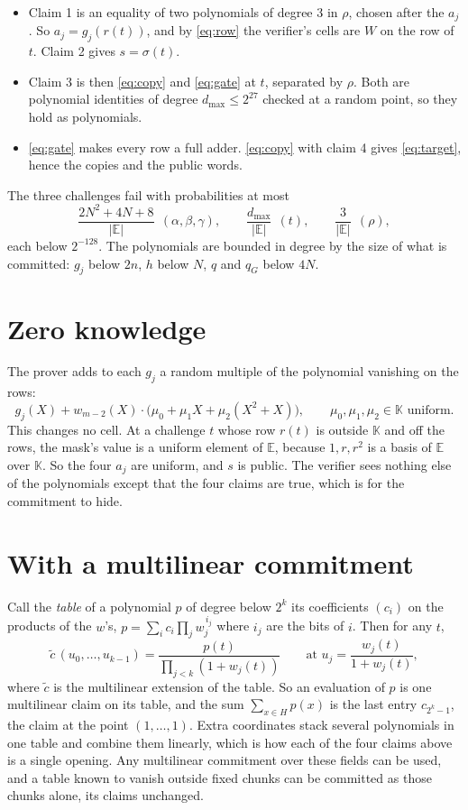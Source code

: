 \documentclass[11pt]{article}
\newcommand{\K}{\mathbb{K}}
\newcommand{\E}{\mathbb{E}}
\begin{document}
\begin{itemize}
  \item Claim 1 is an equality of two polynomials of degree 3 in $\rho$, chosen after the $a_j$. So $a_j = g_j(r(t))$, and by \eqref{eq:row} the verifier's cells are $W$ on the row of $t$. Claim 2 gives $s = \sigma(t)$.
  \item Claim 3 is then \eqref{eq:copy} and \eqref{eq:gate} at $t$, separated by $\rho$. Both are polynomial identities of degree $d_{\max} \le 2^{27}$ checked at a random point, so they hold as polynomials.
  \item \eqref{eq:gate} makes every row a full adder. \eqref{eq:copy} with claim 4 gives \eqref{eq:target}, hence the copies and the public words.
\end{itemize}
The three challenges fail with probabilities at most
\[
  \frac{2N^2 + 4N + 8}{|\E|} \ \ (\alpha, \beta, \gamma), \qquad \frac{d_{\max}}{|\E|} \ \ (t), \qquad \frac{3}{|\E|} \ \ (\rho),
\]
each below $2^{-128}$. The polynomials are bounded in degree by the size of what is committed: $g_j$ below $2n$, $h$ below $N$, $q$ and $q_G$ below $4N$.

\section{Zero knowledge}

The prover adds to each $g_j$ a random multiple of the polynomial vanishing on the rows:
\[
  g_j(X) + w_{m-2}(X) \cdot \bigl(\mu_0 + \mu_1 X + \mu_2 (X^2 + X)\bigr), \qquad \mu_0, \mu_1, \mu_2 \in \K \text{ uniform} .
\]
This changes no cell. At a challenge $t$ whose row $r(t)$ is outside $\K$ and off the rows, the mask's value is a uniform element of $\E$, because $1, r, r^2$ is a basis of $\E$ over $\K$. So the four $a_j$ are uniform, and $s$ is public. The verifier sees nothing else of the polynomials except that the four claims are true, which is for the commitment to hide.

\section{With a multilinear commitment}\label{sec:pcs}

Call the \emph{table} of a polynomial $p$ of degree below $2^k$ its coefficients $(c_i)$ on the products of the $w$'s, $p = \sum_i c_i \prod_j w_j^{\,i_j}$ where $i_j$ are the bits of $i$. Then for any $t$,
\[
  \widetilde{c}\,(u_0, \dots, u_{k-1}) = \frac{p(t)}{\prod_{j < k} (1 + w_j(t))} \qquad \text{at } u_j = \frac{w_j(t)}{1 + w_j(t)} ,
\]
where $\widetilde{c}$ is the multilinear extension of the table. So an evaluation of $p$ is one multilinear claim on its table, and the sum $\sum_{x \in H} p(x)$ is the last entry $c_{2^k - 1}$, the claim at the point $(1, \dots, 1)$. Extra coordinates stack several polynomials in one table and combine them linearly, which is how each of the four claims above is a single opening. Any multilinear commitment over these fields can be used, and a table known to vanish outside fixed chunks can be committed as those chunks alone, its claims unchanged.
\end{document}

